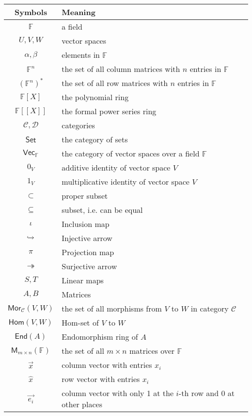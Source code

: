 \documentclass[
	11pt, %
	fleqn, %
	a4paper, %
]{LegrandOrangeBook}
\newcommand{\End}[1]{\mathsf{End}(#1)} %
\newcommand{\Hom}{\mathsf{Hom}} %
\newcommand{\F}{\mathbb{F}} %
\newcommand{\M}[2]{\mathsf{M}_{#1}(#2)} %
\newcommand{\C}{\mathcal{C}} %
\newcommand{\D}{\mathcal{D}} %
\newcommand{\Set}{\boldsymbol{\mathsf{Set}}} %
\newcommand{\Vect}{\boldsymbol{\mathsf{Vec}}} %
\newcommand{\Mor}{\mathsf{Mor}} %
\begin{document}
\noindent \begin{tabularx}{\textwidth}{cX}
    \toprule
    \textbf{Symbols} & \textbf{Meaning} \\
    \midrule
    $\F$ & a field \\
    $U, V, W$ & vector spaces \\
    $\alpha, \beta$ & elements in $\F$ \\
    $\F^n$ & the set of all column matrices with $n$ entries in $\F$ \\
    $(\F^n)^*$ & the set of all row matrices with $n$ entries in $\F$ \\
    $\F[X]$ & the polynomial ring \\
    $\F[[X]]$ & the formal power series ring \\
    \midrule
    $\C, \D$ & categories \\
    $\Set$ & the category of sets \\
    $\Vect_{\F}$ & the category of vector spaces over a field $\F$ \\
    \midrule
    $0_V$ & additive identity of vector space $V$ \\
    $1_V$ & multiplicative identity of vector space $V$ \\
    \midrule
    $\subset$ & proper subset \\
    $\subseteq$ & subset, i.e. can be equal \\
    \midrule
    $\iota$ & Inclusion map \\
    $\xhookrightarrow{}$ & Injective arrow \\
    $\pi$ & Projection map \\
    $\twoheadrightarrow$ & Surjective arrow \\
    \midrule
    $S, T$ & Linear maps \\
    $A, B$ & Matrices \\
    \midrule
    $\Mor_{\C}(V, W)$ & the set of all morphisms from $V$ to $W$ in category $\C$ \\
    $\Hom(V, W)$ & Hom-set of $V$ to $W$ \\
    $\End{A}$ & Endomorphism ring of $A$ \\
    $\M{m \times n}{\F}$ & the set of all $m \times n$ matrices over $\F$ \\
    \midrule
    $\vec{x}$ & column vector with entries $x_i$ \\
    $\hat{x}$ & row vector with entries $x_i$ \\
    $\vec{e_i}$ & column vector with only 1 at the $i$-th row and 0 at other places \\

\end{tabularx}
\end{document}
